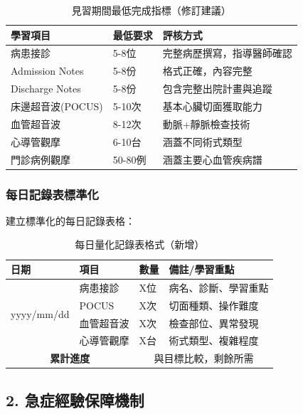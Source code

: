 \documentclass[12pt,a4paper]{article}
\begin{document}
\begin{table}[h]
\centering
\caption{見習期間最低完成指標（修訂建議）}
\begin{tabular}{|p{4cm}|p{2cm}|p{6cm}|}
\hline
\textbf{學習項目} & \textbf{最低要求} & \textbf{評核方式} \\
\hline
病患接診 & 5-8位 & 完整病歷撰寫，指導醫師確認 \\
\hline
Admission Notes & 5-8份 & 格式正確，內容完整 \\
\hline
Discharge Notes & 5-8份 & 包含完整出院計畫與追蹤 \\
\hline
床邊超音波(POCUS) & 5-10次 & 基本心臟切面獲取能力 \\
\hline
血管超音波 & 8-12次 & 動脈+靜脈檢查技術 \\
\hline
心導管觀摩 & 6-10台 & 涵蓋不同術式類型 \\
\hline
門診病例觀摩 & 50-80例 & 涵蓋主要心血管疾病譜 \\
\hline
\end{tabular}
\end{table}

\subsubsection{每日記錄表標準化}
建立標準化的每日記錄表格：

\begin{table}[h]
\centering
\caption{每日量化記錄表格式（新增）}
\begin{tabular}{|p{3cm}|p{2cm}|p{2cm}|p{5cm}|}
\hline
\textbf{日期} & \textbf{項目} & \textbf{數量} & \textbf{備註/學習重點} \\
\hline
\multirow{4}{*}{yyyy/mm/dd} & 病患接診 & X位 & 病名、診斷、學習重點 \\
\cline{2-4}
& POCUS & X次 & 切面種類、操作難度 \\
\cline{2-4}
& 血管超音波 & X次 & 檢查部位、異常發現 \\
\cline{2-4}
& 心導管觀摩 & X台 & 術式類型、複雜程度 \\
\hline
\multicolumn{2}{|c|}{\textbf{累計進度}} & \multicolumn{2}{|c|}{與目標比較，剩餘所需} \\
\hline
\end{tabular}
\end{table}

\subsection{2. 急症經驗保障機制}
\end{document}
